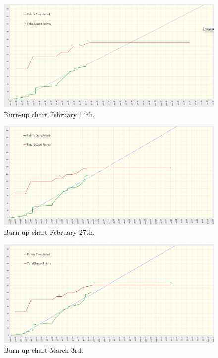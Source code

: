     \begin{figure}[H]
      \centering
      \includegraphics[width=12cm]{assets/outputs/burnups/02-14.png}
      \caption{Burn-up chart February 14th.}
      \label{fig:burnup4}
    \end{figure}
  
    \begin{figure}[H]
      \centering
      \includegraphics[width=12cm]{assets/outputs/burnups/02-27.png}
      \caption{Burn-up chart February 27th.}
      \label{fig:burnup5}
    \end{figure}
  
    \begin{figure}[H]
      \centering
      \includegraphics[width=12cm]{assets/outputs/burnups/03-03.png}
      \caption{Burn-up chart March 3rd.}
      \label{fig:burnup6}
    \end{figure}
  

